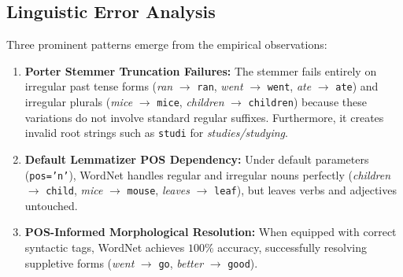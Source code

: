 \documentclass[12pt,a4paper]{report}
\begin{document}
\subsection{Linguistic Error Analysis}
Three prominent patterns emerge from the empirical observations:
\begin{enumerate}
    \item \textbf{Porter Stemmer Truncation Failures:} The stemmer fails entirely on irregular past tense forms (\textit{ran} $\to$ \texttt{ran}, \textit{went} $\to$ \texttt{went}, \textit{ate} $\to$ \texttt{ate}) and irregular plurals (\textit{mice} $\to$ \texttt{mice}, \textit{children} $\to$ \texttt{children}) because these variations do not involve standard regular suffixes. Furthermore, it creates invalid root strings such as \texttt{studi} for \textit{studies/studying}.
    \item \textbf{Default Lemmatizer POS Dependency:} Under default parameters (\texttt{pos='n'}), WordNet handles regular and irregular nouns perfectly (\textit{children} $\to$ \texttt{child}, \textit{mice} $\to$ \texttt{mouse}, \textit{leaves} $\to$ \texttt{leaf}), but leaves verbs and adjectives untouched.
    \item \textbf{POS-Informed Morphological Resolution:} When equipped with correct syntactic tags, WordNet achieves $100\%$ accuracy, successfully resolving suppletive forms (\textit{went} $\to$ \texttt{go}, \textit{better} $\to$ \texttt{good}).
\end{enumerate}
\end{document}
